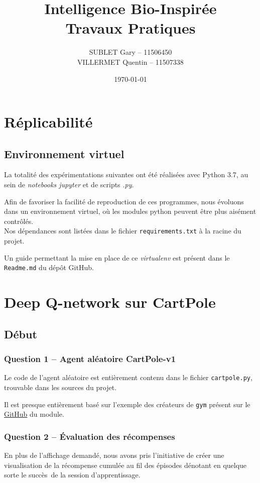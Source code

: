 \documentclass[12pt,french]{article}
\author{SUBLET Gary -- 11506450 \\[.3em] VILLERMET Quentin -- 11507338}
\date{\today}
\title{Intelligence Bio-Inspirée \\[.5em] Travaux Pratiques}
\begin{document}

\tableofcontents
\newpage

\section{Réplicabilité}
\subsection{Environnement virtuel}

La totalité des expérimentations suivantes ont été réalisées avec Python 3.7, au sein de \textit{notebooks jupyter} et de scripts \textit{.py}.

Afin de favoriser la facilité de reproduction de ces programmes, nous évoluons dans un environnement virtuel, où les modules python peuvent être plus aisément contrôlés. \\
Nos dépendances sont listées dans le fichier \texttt{requirements.txt} à la racine du projet.

Un guide permettant la mise en place de ce \textit{virtualenv} est présent dans le \texttt{Readme.md} du dépôt GitHub.

\section{Deep Q-network sur CartPole}
\subsection{Début}
\subsubsection{Question 1 -- Agent aléatoire CartPole-v1}

Le code de l'agent aléatoire est entièrement contenu dans le fichier \texttt{cartpole.py}, trouvable dans les sources du projet.

Il est presque entièrement basé sur l'exemple des créateurs de \texttt{gym} présent sur le \href{https://github.com/openai/gym}{GitHub} du module.

\subsubsection{Question 2 -- Évaluation des récompenses}

\begin{note}
En plus de l'affichage demandé, nous avons pris l'initiative de créer une visualisation de la récompense cumulée au fil des épisodes dénotant en quelque sorte le \og succès\fg\, de la session d'apprentissage.
\end{note}
\end{document}
